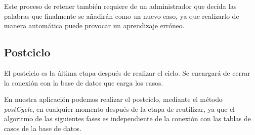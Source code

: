 Este proceso de retener también requiere de un administrador que decida las palabras que finalmente se añadirán como un nuevo caso, ya que realizarlo de manera automática puede provocar un aprendizaje erróneo.


\subsection{Postciclo}\label{postciclo}

El postciclo es la última etapa después de realizar el ciclo. Se encargará de cerrar la conexión con la base de datos que carga los casos.

En nuestra aplicación podemos realizar el postciclo, mediante el método \emph{postCycle}, en cualquier momento después de la etapa de reutilizar, ya que el algoritmo de las siguientes fases es independiente de la conexión con las tablas de casos de la base de datos.